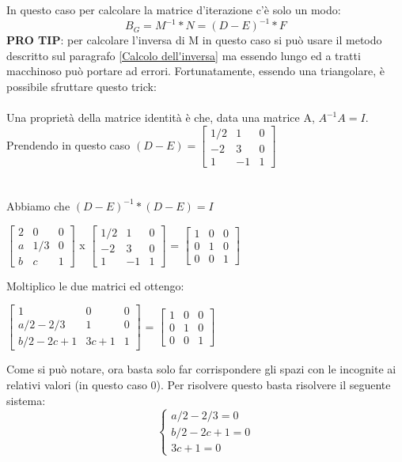 In questo caso per calcolare la matrice d'iterazione c'è solo un modo: 
$$B_G = M^{-1}*N = (D-E)^{-1}*F $$
\noindent
\textbf{PRO TIP}: per calcolare l'inversa di M in questo caso si può usare il metodo descritto sul paragrafo \ref{Calcolo dell'inversa} ma essendo lungo ed a tratti macchinoso può portare ad errori. Fortunatamente, essendo una triangolare, è possibile sfruttare questo trick:
\\
\\
\noindent
Una proprietà della matrice identità è che, data una matrice A, $A^{-1}A = I$.
Prendendo in questo caso $(D-E) =
\begin{bmatrix}
1/2 & 1 & 0 \\
-2 & 3 & 0 \\
1 & -1 & 1 
\end{bmatrix}
$ 
\\ \\ \\
\noindent
Abbiamo che $(D-E)^{-1}*(D-E) = I$
\begin{center}
$
\begin{bmatrix}
2 & 0 & 0 \\
a & 1/3 & 0 \\
b & c & 1 
\end{bmatrix}
$
x
$
\begin{bmatrix}
1/2 & 1 & 0 \\
-2 & 3 & 0 \\
1 & -1 & 1 
\end{bmatrix}
$
=
$
\begin{bmatrix}
1 & 0 & 0 \\
0 & 1 & 0 \\
0 & 0 & 1
\end{bmatrix}
$
\end{center}
\noindent
Moltiplico le due matrici ed ottengo: \\
\begin{center}
$
\begin{bmatrix}
1 & 0 & 0 \\
a/2 - 2/3 & 1 & 0 \\
b/2 - 2c+1 & 3c+1 & 1 
\end{bmatrix}
$
=
$
\begin{bmatrix}
1 & 0 & 0 \\
0 & 1 & 0 \\
0 & 0 & 1
\end{bmatrix}
$
\end{center}
\noindent
Come si può notare, ora basta solo far corrispondere gli spazi con le incognite ai relativi valori (in questo caso 0). Per risolvere questo basta risolvere il seguente sistema:
$$\left\{
  \begin{array}{lr}
    a/2 -2/3 = 0 \\
    b/2 -2c+1 = 0 \\
    3c+1 = 0 
  \end{array}
\right.
$$

